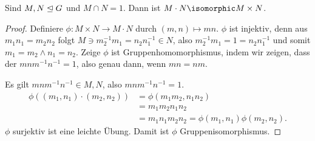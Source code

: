 \begin{lem} \label{2.4}
	Sind $M, N \trianglelefteq G$ und $M \cap N = 1$.
	Dann ist $M \cdot N \isomorphic M \times N$.
	\begin{proof}
		Definiere $\phi: M \times N \to M\cdot N$ durch $(m, n) \mapsto mn$.
		$\phi$ ist injektiv, denn aus $m_1 n_1 = m_2 n_2$ folgt $M \ni m_2^{-1} m_1 = n_2 n_1^{-1} \in N$, also $m_2^{-1}m_1 = 1 = n_2 n_1^{-1}$ und somit $m_1 = m_2 \land n_1 = n_2$.
		Zeige $\phi$ ist Gruppenhomomorphismus, indem wir zeigen, dass der  $m n m^{-1} n^{-1} = 1$, also genau dann, wenn $m n = n m$.

		Es gilt $mn m^{-1}n^{-1} \in M, N$, also $mnm^{-1}n^{-1} = 1$.
		\begin{align*}
			\phi((m_1, n_1) \cdot (m_2, n_2))
			&= \phi(m_1m_2, n_1n_2) \\
			&= m_1 m_2 n_1 n_2 \\
			&= m_1 n_1 m_2 n_2
			= \phi(m_1, n_1) \phi(m_2, n_2).
		\end{align*}
		$\phi$ surjektiv ist eine leichte Übung.
		Damit ist $\phi$ Gruppenisomorphismus.
	\end{proof}
\end{lem}

